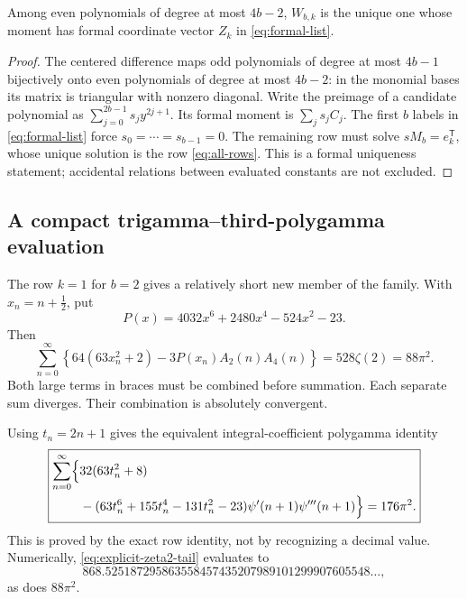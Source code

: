 \begin{proposition}
\label{prop:filter-unique}
Among even polynomials of degree at most $4b-2$, $W_{b,k}$ is the
unique one whose moment has formal coordinate vector $Z_k$ in
\eqref{eq:formal-list}.
\end{proposition}
\begin{proof}
The centered difference maps odd polynomials of degree at most
$4b-1$ bijectively onto even polynomials of degree at most $4b-2$:
in the monomial bases its matrix is triangular with nonzero diagonal.
Write the preimage of a candidate polynomial as
$\sum_{j=0}^{2b-1}s_jy^{2j+1}$. Its formal moment is
$\sum_js_jC_j$. The first $b$ labels in \eqref{eq:formal-list}
force $s_0=\cdots=s_{b-1}=0$. The remaining row must solve
$sM_b=e_k^{\mathsf T}$, whose unique solution is the row
\eqref{eq:all-rows}. This is a formal uniqueness statement; accidental
relations between evaluated constants are not excluded.
\end{proof}

\subsection{A compact trigamma--third-polygamma evaluation}

The row $k=1$ for $b=2$ gives a relatively short new member of the
family. With $x_n=n+\tfrac12$, put
\[
 P(x)=4032x^6+2480x^4-524x^2-23.
\]
Then
\begin{equation}\label{eq:explicit-zeta2-tail}
 \boxed{\displaystyle
 \sum_{n=0}^{\infty}
 \left\{64(63x_n^2+2)-3P(x_n)A_2(n)A_4(n)\right\}
 =528\zeta(2)=88\pi^2.}
\end{equation}
Both large terms in braces must be combined before summation. Each
separate sum diverges. Their combination is absolutely convergent.

Using $t_n=2n+1$ gives the equivalent integral-coefficient
polygamma identity
\begin{equation}\label{eq:explicit-zeta2-polygamma}
 \boxed{\begin{aligned}
 \sum_{n=0}^{\infty}\Bigl\{
 &32(63t_n^2+8)\\
 &-(63t_n^6+155t_n^4-131t_n^2-23)
          \psi'(n+1)\psi'''(n+1)\Bigr\}=176\pi^2.
 \end{aligned}}
\end{equation}
This is proved by the exact row identity, not by recognizing a decimal
value. Numerically, \eqref{eq:explicit-zeta2-tail} evaluates to
\[
 868.525187295863558457435207989101299907605548\ldots,
\]
as does $88\pi^2$.

